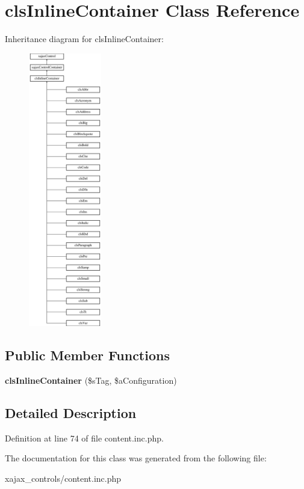 \hypertarget{classclsInlineContainer}{
\section{clsInlineContainer Class Reference}
\label{classclsInlineContainer}
}
Inheritance diagram for clsInlineContainer:\begin{figure}[H]
\begin{center}
\leavevmode
\includegraphics[height=12.000000cm]{classclsInlineContainer}
\end{center}
\end{figure}
\subsection*{Public Member Functions}
\begin{DoxyCompactItemize}
\item 
\hypertarget{classclsInlineContainer_ad0188701a5749da3222e0e52e6649487}{
{\bfseries clsInlineContainer} (\$sTag, \$aConfiguration)}
\label{classclsInlineContainer_ad0188701a5749da3222e0e52e6649487}

\end{DoxyCompactItemize}


\subsection{Detailed Description}


Definition at line 74 of file content.inc.php.



The documentation for this class was generated from the following file:\begin{DoxyCompactItemize}
\item 
xajax\_\-controls/content.inc.php\end{DoxyCompactItemize}
